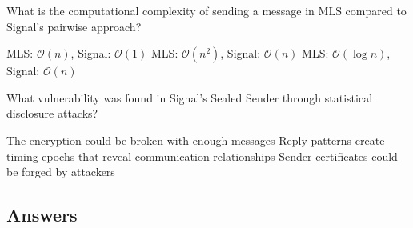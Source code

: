 \documentclass[10pt,a4paper,american]{exam}
\begin{document}
\begin{questions}
	\question What is the computational complexity of sending a message in MLS compared to Signal's pairwise approach?
	\begin{randomizechoices}
		\choice MLS: $\mathcal{O}(n)$, Signal: $\mathcal{O}(1)$
		\choice MLS: $\mathcal{O}(n^2)$, Signal: $\mathcal{O}(n)$
		\CorrectChoice MLS: $\mathcal{O}(\log{}n)$, Signal: $\mathcal{O}(n)$
	\end{randomizechoices}

	\question What vulnerability was found in Signal's Sealed Sender through statistical disclosure attacks?
	\begin{randomizechoices}
		\choice The encryption could be broken with enough messages
		\CorrectChoice Reply patterns create timing epochs that reveal communication relationships
		\choice Sender certificates could be forged by attackers
	\end{randomizechoices}

\end{questions}

\clearpage

\subsection*{Answers}
\printkeytable
\end{document}
